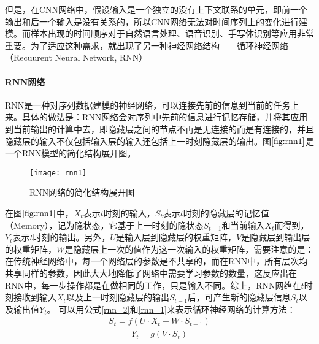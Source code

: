 但是，在CNN网络中，假设输入是一个独立的没有上下文联系的单元，即前一个输出和后一个输入是没有关系的，所以CNN网络无法对时间序列上的变化进行建模。而样本出现的时间顺序对于自然语言处理、语音识别、手写体识别等应用非常重要。为了适应这种需求，就出现了另一种神经网络结构——循环神经网络（Recuurent Neural Network, RNN）

 \paragraph{RNN网络}
RNN是一种对序列数据建模的神经网络，可以连接先前的信息到当前的任务上来。具体的做法是：RNN网络会对序列中先前的信息进行记忆存储，并将其应用到当前输出的计算中去，即隐藏层之间的节点不再是无连接的而是有连接的，并且隐藏层的输入不仅包括输入层的输入还包括上一时刻隐藏层的输出。图$\ref{fig:rnn1}$是一个RNN模型的简化结构展开图。
\begin{figure}[htbp]
\centering
\texttt{[image: rnn1]}
\caption{RNN网络的简化结构展开图}
\label{fig:rnn1}
\end{figure}

在图$\ref{fig:rnn1}$中，$X_{t}$表示$t$时刻的输入，$S_{t}$表示$t$时刻的隐藏层的记忆值（Memory），记为隐状态，它基于上一时刻的隐状态$S_{t-1}$和当前输入$X_{t}$而得到，
$Y_{t}$表示$t$时刻的输出。另外，$U$是输入层到隐藏层的权重矩阵，$V$是隐藏层到输出层的权重矩阵，$W$是隐藏层上一次的值作为这一次输入的权重矩阵，需要注意的是：在传统神经网络中，每一个网络层的参数是不共享的，而在RNN中，所有层次均共享同样的参数，因此大大地降低了网络中需要学习参数的数量，这反应出在RNN中，每一步操作都是在做相同的工作，只是输入不同。综上，RNN网络在$t$时刻接收到输入$X_{t}$以及上一时刻隐藏层的输出$S_{t-1}$后，可产生新的隐藏层信息$S_{t}$以及输出值$Y_{t}$。
可以用公式\eqref{rnn_2}和\eqref{rnn_1}来表示循环神经网络的计算方法：
\begin{equation}
\label{rnn_2}
\begin{aligned}
S_{t}=f(U \cdot X_{t}+W \cdot S_{t-1})
\end{aligned}
\end{equation}
\begin{equation}
\label{rnn_1}
\begin{aligned}
Y_{t}=g(V \cdot  S_{t})
\end{aligned}
\end{equation}

